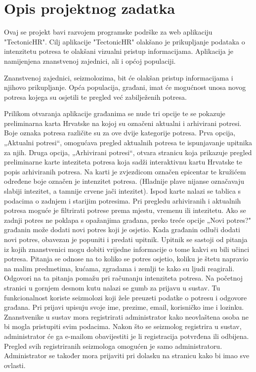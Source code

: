 \chapter{Opis projektnog zadatka}
		


{Ovaj se projekt bavi razvojem programske podrške za web aplikaciju "TectonicHR". 
	Cilj aplikacije "TectonicHR" olakšano je prikupljanje podataka o intenzitetu potresa te olakšani vizualni pristup informacijama. 
	Aplikacija je namijenjena znanstvenoj zajednici, ali i općoj populaciji.
	
	 
	Znanstvenoj zajednici, seizmolozima, bit će olakšan pristup informacijama i njihovo prikupljanje.  
	Opća populacija, građani, imat će mogućnost unosa novog potresa kojega su osjetili te pregled već zabilježenih potresa.  
	
	
	Prilikom otvaranja aplikacije građanima se nude tri opcije te se pokazuje preliminarna karta Hrvatske na kojoj su označeni aktualni i arhivirani potresi. Boje oznaka potresa različite su za ove dvije kategorije potresa.
	Prva opcija, „Aktualni potresi“, omogućava pregled aktualnih potresa te ispunjavanje upitnika za njih. 
	Druga opcija, „Arhivirani potresi“, otvara stranicu koja prikazuje pregled preliminarne karte inteziteta potresa koja sadži interaktivnu kartu Hrvatske te popis arhiviranih potresa. 
	Na karti je zvjezdicom označen epicentar te kružićem određene boje označen je intenzitet potresa. (Hladnije plave nijanse označavaju slabiji intezitet, a tamnije crvene jači intezitet). 
	Ispod karte nalazi se tablica s podacima o zadnjem i starijim potresima. Pri pregledu arhiviranih i aktualnih potresa moguće je filtrirati potrese prema mjestu, vremenu ili intezitetu. 
	Ako se zadnji potres ne poklapa s opažanjima građana, preko treće opcije „Novi potres?" građanin može dodati novi potres koji je osjetio. 
	Kada građanin odluči dodati novi potres, obavezan je popuniti i predati upitnik. 
	Upitnik se sastoji od pitanja iz kojih znanstvenici mogu dobiti vrijedne informacije o tome kakvi su bili učinci potresa. 
	Pitanja se odnose na to koliko se potres osjetio, koliku je štetu napravio na malim predmetima, kućama, zgradama i zemlji te kako su ljudi reagirali. 
	Odgovori na ta pitanja pomažu pri računanju intenziteta potresa. 
	Na početnoj stranici u gornjem desnom kutu nalazi se gumb za prijavu u sustav. Tu funkcionalnost koriste seizmolozi koji žele preuzeti podatke o potresu i odgovore građana.  Pri prijavi upisuju svoje ime, prezime, email, korisničko ime i lozinku. 
	Znanstvenike u sustav mora registrirati administrator kako neovlaštena osoba ne bi mogla pristupiti svim podacima. Nakon što se seizmolog registrira u sustav, administrator će ga e-mailom obavijestiti je li registracija potvrđena ili odbijena. 
	Pregled svih registriranih seizmologa omogućen je samo administratoru.
	Administrator se također mora prijaviti pri dolasku na stranicu kako bi imao sve ovlasti. \\
	
	}
	
